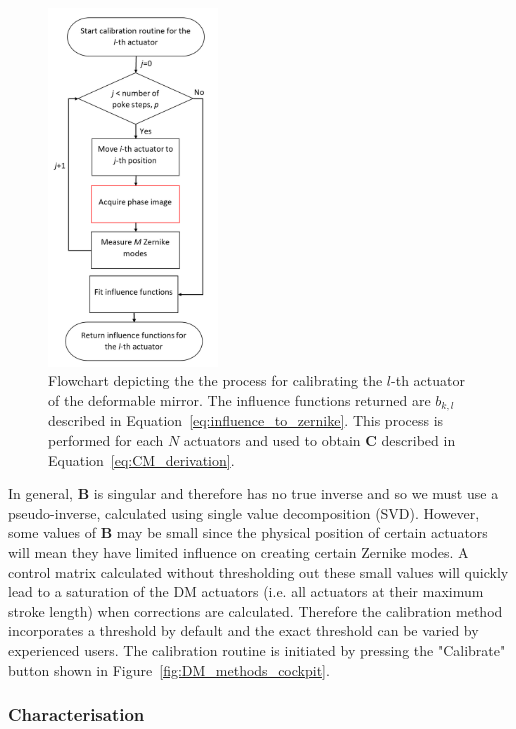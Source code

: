 \begin{figure}[h]
	\centering
	\includegraphics[width=0.4\textwidth, scale=0.5]{./images/Ith_actuator_calibration_workflow.jpg}
	\caption{Flowchart depicting the the process for calibrating the $l$-th actuator of the deformable mirror. The influence functions returned are $b_{k,l}$ described in Equation~\ref{eq:influence_to_zernike}. This process is performed for each $N$ actuators and used to obtain $\boldsymbol{C}$ described in Equation~\ref{eq:CM_derivation}.}
	\label{fig:Ith_actuator_calibration_workflow}
\end{figure}

In general, $\boldsymbol{B}$ is singular and therefore has no true inverse and so we must use a pseudo-inverse, calculated using single value decomposition (SVD). However, some values of $\boldsymbol{B}$ may be small since the physical position of certain actuators will mean they have limited influence on creating certain Zernike modes. A control matrix calculated without thresholding out these small values will quickly lead to a saturation of the DM actuators (i.e. all actuators at their maximum stroke length) when corrections are calculated.\cite{booth2005methods} Therefore the calibration method incorporates a threshold by default and the exact threshold can be varied by experienced users. The calibration routine is initiated by pressing the "Calibrate" button shown in Figure~\ref{fig:DM_methods_cockpit}.

\subsubsection{Characterisation}
\label{subsubsec:characterisation}

